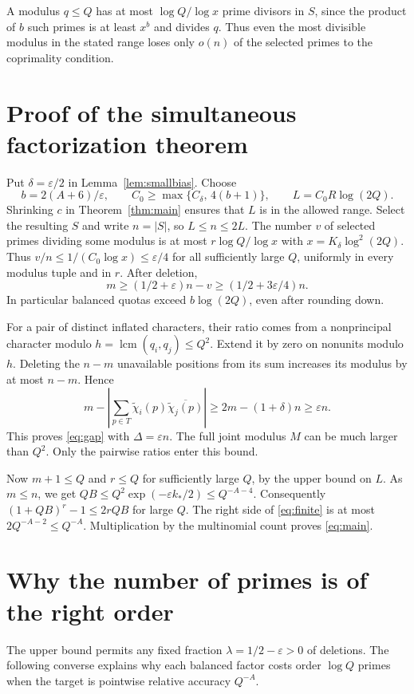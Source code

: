 \documentclass[11pt]{article}
\newcommand{\e}{\varepsilon}
\begin{document}
A modulus $q\leq Q$ has at most $\log Q/\log x$ prime divisors in $S$,
since the product of $b$ such primes is at least $x^b$ and divides $q$.
Thus even the most divisible modulus in the stated range loses only $o(n)$
of the selected primes to the coprimality condition.

\section{Proof of the simultaneous factorization theorem}\label{sec:mainproof}
Put $\delta=\e/2$ in Lemma~\ref{lem:smallbias}. Choose
\[
 b=2(A+6)/\e,\qquad C_0\ge\max\{C_\delta,\,4(b+1)\},
 \qquad L=C_0R\log(2Q).
\]
Shrinking $c$ in Theorem~\ref{thm:main} ensures that $L$ is in the allowed range. Select the resulting $S$ and write $n=|S|$, so $L\le n\le 2L$. The number $v$ of selected primes dividing some modulus is at most $r\log Q/\log x$ with $x=K_\delta\log^2(2Q)$. Thus $v/n\le 1/(C_0\log x)\le\e/4$ for all sufficiently large $Q$, uniformly in every modulus tuple and in $r$. After deletion,
\[
 m\ge(1/2+\e)n-v\ge(1/2+3\e/4)n.
\]
In particular balanced quotas exceed $b\log(2Q)$, even after rounding down.

For a pair of distinct inflated characters, their ratio comes from a nonprincipal character modulo $h=\operatorname{lcm}(q_i,q_j)\le Q^2$. Extend it by zero on nonunits modulo $h$. Deleting the $n-m$ unavailable positions from its sum increases its modulus by at most $n-m$. Hence
\[
 m-\left|\sum_{p\in T}\widetilde\chi_i(p)\overline{\widetilde\chi_j(p)}\right|
 \ge 2m-(1+\delta)n\ge\e n .
\]
This proves \eqref{eq:gap} with $\Delta=\e n$. The full joint modulus $M$ can be much larger than $Q^2$. Only the pairwise ratios enter this bound.

Now $m+1\le Q$ and $r\le Q$ for sufficiently large $Q$, by the upper bound on $L$. As $m\le n$, we get
$QB\le Q^2\exp(-\e k_*/2)\le Q^{-A-4}$.
Consequently $(1+QB)^r-1\le 2rQB$ for large $Q$. The right side of \eqref{eq:finite} is at most $2Q^{-A-2}\le Q^{-A}$. Multiplication by the multinomial count proves \eqref{eq:main}.

\section{Why the number of primes is of the right order}
The upper bound permits any fixed fraction $\lambda=1/2-\e>0$ of deletions. The following converse explains why each balanced factor costs order $\log Q$ primes when the target is pointwise relative accuracy $Q^{-A}$.
\end{document}
